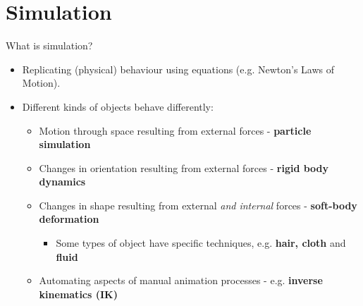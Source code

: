\part{Simulation}
\frame{\partpage}

\begin{frame}{What is simulation?}
	\begin{itemize}
		\pause\item Replicating (physical) behaviour using equations (e.g. Newton's Laws of Motion).
		\pause\item Different kinds of objects behave differently:
		\begin{itemize}
			\pause\item Motion through space resulting from external forces - \textbf{particle simulation}
			\pause\item Changes in orientation resulting from external forces - \textbf{rigid body dynamics}
			\pause\item Changes in shape resulting from external \textit{and internal} forces - \textbf{soft-body deformation}
			\begin{itemize}
				\pause\item Some types of object have specific techniques, e.g. \textbf{hair, cloth} and \textbf{fluid}
			\end{itemize}
			\pause\item Automating aspects of manual animation processes - e.g. \textbf{inverse kinematics (IK)}
		\end{itemize}
	\end{itemize}
\end{frame}

